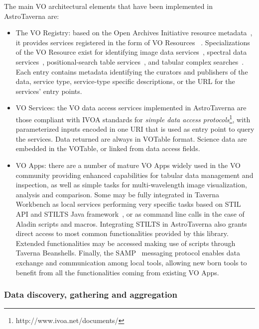 \documentclass{aa}
\begin{document}
The main VO architectural elements that have been implemented in AstroTaverna are:

\begin{itemize}
\item The VO Registry: based on the Open Archives Initiative resource metadata~\citep{2002OAI-PMH},  it provides services registered in the form of VO Resources ~\citep{Hanisch2007}. Specializations of the VO Resource exist for identifying image data services~\citep[Simple Image Access Protocol;][]{Tody2009}, spectral data services~\citep[Simple Spectral Access Protocol;][]{Tody2012}, positional-search table services~\citep[ConeSearch Protocol;][]{Williams2008}, and tabular complex searches~\citep[Tabular Access Protocol;][]{Dowler2010}. Each entry contains metadata identifying the curators and publishers of the data, service type, service-type specific descriptions, or the URL for the services’ entry points. 

\item VO Services: the VO data access services implemented in AstroTaverna are those compliant with IVOA standards for \textit{simple data access protocols}\footnote{http://www.ivoa.net/documents/}, with parameterized inputs encoded in one URI that is used as entry point to query the services. Data returned are always in VOTable format. Science data are embedded in the VOTable, or linked from data access fields.

\item VO Apps: there are a number of mature VO Apps widely used in the VO community providing enhanced capabilities for tabular data management and inspection, as well as simple tasks for multi-wavelength image visualization, analysis and comparison. Some may be fully integrated in Taverna Workbench as local services performing very specific tasks based on STIL API and STILTS Java framework~\citep{Taylor2006}, or as command line calls in the case of Aladin scripts and macros. Integrating STILTS in AstroTaverna also grants direct access to most common functionalities provided by this library. Extended functionalities may be accessed making use of scripts through Taverna Beanshells. Finally, the SAMP~\citep[Simple Application Messaging Protocol;][]{Taylor2012} messaging protocol enables data exchange and communication among local tools, allowing new born tools to benefit from all the functionalities coming from existing VO Apps.
\end{itemize}

\subsubsection{Data discovery, gathering and aggregation}
\label{DataDiscovery}
\end{document}
